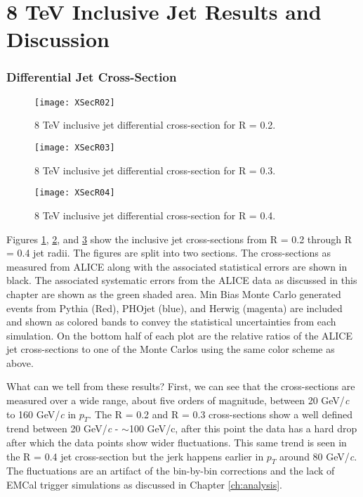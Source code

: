 \section{8 TeV Inclusive Jet Results and Discussion}

\subsubsection{Differential Jet Cross-Section}

\begin{figure}[h]
\texttt{[image: XSecR02]}
\centering
\caption{8 TeV inclusive jet differential cross-section for R = 0.2.}
\label{fig:JetXsecR02}
\end{figure}

\begin{figure}[h]
\texttt{[image: XSecR03]}
\centering
\caption{8 TeV inclusive jet differential cross-section for R = 0.3.}
\label{fig:JetXsecR03}
\end{figure}

\begin{figure}[h]
\texttt{[image: XSecR04]}
\centering
\caption{8 TeV inclusive jet differential cross-section for R = 0.4.}
\label{fig:JetXsecR04}
\end{figure}

\noindent
Figures \ref{fig:JetXsecR02}, \ref{fig:JetXsecR03}, and \ref{fig:JetXsecR04} show the inclusive jet cross-sections from R = 0.2 through R = 0.4 jet radii.  The figures are split into two sections.  The cross-sections as measured from ALICE along with the associated statistical errors are shown in black.  The associated systematic errors from the ALICE data as discussed in this chapter are shown as the green shaded area.  Min Bias Monte Carlo generated events from Pythia (Red), PHOjet (blue), and Herwig (magenta) are included and shown as colored bands to convey the statistical uncertainties from each simulation.  On the bottom half of each plot are the relative ratios of the ALICE jet cross-sections to one of the Monte Carlos using the same color scheme as above.  

What can we tell from these results?  First, we can see that the cross-sections are measured over a wide range, about five orders of magnitude, between 20 GeV/\textit{c} to 160 GeV/\textit{c} in $p_{T}$.  The R = 0.2 and R = 0.3 cross-sections show a well defined trend between 20 GeV/\textit{c} - $\sim$100 GeV/c, after this point the data  has a hard drop after which the data points show wider fluctuations.  This same trend is seen in the R = 0.4 jet cross-section but the jerk happens earlier in $p_{T}$ around  80 GeV/\textit{c}.  The fluctuations are an artifact of the bin-by-bin corrections and the lack of EMCal trigger simulations as discussed in Chapter \ref{ch:analysis}.  

